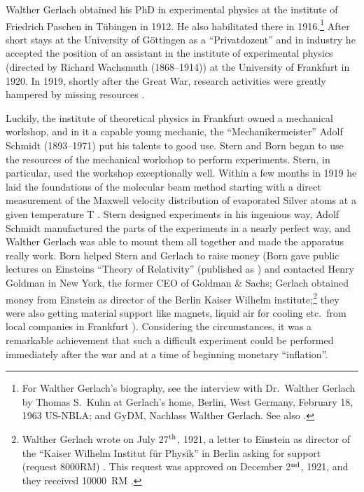 \documentclass[12pt]{article}
\begin{document}
Walther Gerlach obtained his PhD in experimental physics at the institute of Friedrich Paschen in Tübingen in 1912. He also habilitated there in 1916.\footnote{For Walther Gerlach's biography, see the interview with Dr.~Walther Gerlach by Thomas S.\ Kuhn at Gerlach's home, Berlin, West Germany, February 18, 1963 US-NBLA; and GyDM, Nachlass Walther Gerlach. See also \citep{HuberJG2014Gerlach,FuesslW1998Nachlass,HeinrichREtal1989Gerlach, NidaRuemelinM1982Bibliographie}.} After short stays at the University of Göttingen as a ``Privatdozent'' and in industry he accepted the position of an assistant in the institute of experimental physics (directed by Richard Wachsmuth (1868--1914)) at the University of Frankfurt in 1920. In 1919, shortly after the Great War, research activities were greatly hampered by missing resources \citep{FrickeHNoDateJahre}. 

Luckily, the institute of theoretical physics in Frankfurt owned a mechanical workshop, and in it a  capable young mechanic, the ``Mechanikermeister'' Adolf Schmidt (1893--1971) put his talents to good use. Stern and Born began to use the resources of the mechanical workshop to perform experiments. Stern, in particular, used the workshop exceptionally well. Within a few months in 1919 he laid the foundations of the molecular beam method starting with a direct measurement of the Maxwell velocity distribution of evaporated Silver atoms at a given temperature T \citep{SternO1920Messung,SternO1920Messung2,SternO1920Nachtrag}. Stern designed experiments in his ingenious way, Adolf Schmidt manufactured the parts of the experiments in a nearly perfect way, and Walther Gerlach was able to mount them all together and made the apparatus really work. Born helped Stern and Gerlach to raise money (Born gave public lectures on Einsteins ``Theory of Relativity'' (published as \citep{BornM1920Relativitaetstheorie}) and contacted Henry Goldman in New York, the former CEO of Goldman \& Sachs; Gerlach obtained money from Einstein as director of the Berlin Kaiser Wilhelm institute;\footnote{Walther Gerlach wrote on July 27$^{\rm th}$, 1921, a letter to Einstein as director of the ``Kaiser Wilhelm Institut für Physik'' in Berlin asking for support (request 8000RM) \cite[p.~783]{CPAE13}. This request was approved on December 2$^{\rm nd}$, 1921, 
and they received 10000~RM \cite[pp.~476, 477, 479, 482]{CPAE12}.} they were also getting material support like magnets, liquid air for cooling etc.\ from local companies in Frankfurt \citep{SchmidtBoeckingHEtal2011Stern,ToenniesJEtal2011Stern}). Considering the circumstances, it was a remarkable achievement that such a difficult experiment could be performed immediately after the war and at a time of beginning monetary ``inflation''. 
 
\end{document}
